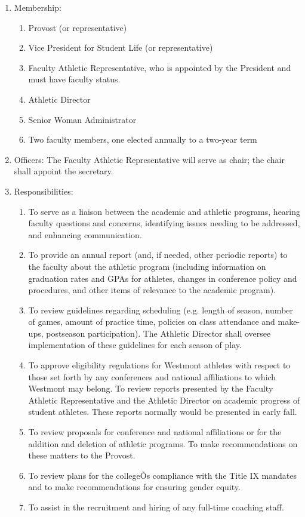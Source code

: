 \documentclass[letterpaper, 11pt]{article}
\begin{document}
					\begin{enumerate}[label=\alph*)]
						\item{Membership:
							\begin{enumerate}[label=\arabic*)]
								\item{Provost (or representative)}
								\item{Vice President for Student Life (or representative)}
								\item{Faculty Athletic Representative, who is appointed by the President and must have faculty status.}
								\item{Athletic Director}
								\item{Senior Woman Administrator}
								\item{Two faculty members, one elected annually to a two-year term}
							\end{enumerate}
						}
						\item{Officers:
							The Faculty Athletic Representative will serve as chair; the chair shall appoint the secretary.
						}
						\item{Responsibilities:
							\begin{enumerate}[label=\arabic*)]
								\item{To serve as a liaison between the academic and athletic programs, hearing faculty questions and concerns, identifying issues needing to be addressed, and enhancing communication.}
								\item{To provide an annual report (and, if needed, other periodic reports) to the faculty about the athletic program (including information on graduation rates and GPAs for athletes, changes in conference policy and procedures, and other items of relevance to the academic program).}
								\item{To review guidelines regarding scheduling (e.g. length of season, number of games, amount of practice time, policies on class attendance and make-ups, postseason participation).  The Athletic Director shall oversee implementation of these guidelines for each season of play.}
								\item{To approve eligibility regulations for Westmont athletes with respect to those set forth by any conferences and national affiliations to which Westmont may belong.  To review reports presented by the Faculty Athletic Representative and the Athletic Director on academic progress of student athletes.  These reports normally would be presented in early fall.}
								\item{To review proposals for conference and national affiliations or for the addition and deletion of athletic programs.  To make recommendations on these matters to the Provost.}
								\item{To review plans for the collegeÕs compliance with the Title IX mandates and to make recommendations for ensuring gender equity.}
								\item{To assist in the recruitment and hiring of any full-time coaching staff.}
							\end{enumerate}
						}
					\end{enumerate}
\end{document}
